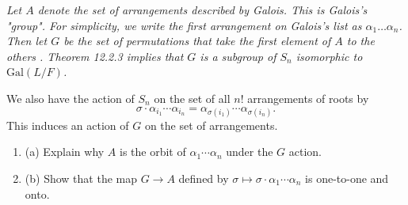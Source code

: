 \documentclass[11pt,a4paper]{article}
\newcommand{\be} {\begin{enumerate}}
\newcommand{\ee} {\end{enumerate}}
\newcommand{\Gal}{\mathrm{Gal}}
\begin{document}
{\it Let $A$ denote the set of arrangements described by Galois. This is Galois's "group". For simplicity, we write the first arrangement on Galois's list as $\alpha_1 \ldots \alpha_n$. Then let $G$ be the set of permutations that take the first element of $A$ to the others . Theorem 12.2.3 implies that $G$ is a subgroup of $S_n$ isomorphic to $\Gal(L/F)$.

We also have the action of $S_n$ on the set of all $n!$ arrangements of roots by
$$\sigma \cdot \alpha_{i_1}\cdots \alpha_{i_n} = \alpha_{\sigma(i_1)}\cdots \alpha_{\sigma(i_n)}.$$
This induces an action of $G$ on the set of arrangements.
\be
\item[(a)] Explain why $A$ is the orbit of $\alpha_1\cdots\alpha_n$ under the $G$ action.
\item[(b)] Show that the map $G\to A$ defined by $\sigma \mapsto \sigma \cdot \alpha_1 \cdots \alpha_n$ is one-to-one and onto.
\ee
}
\end{document}
